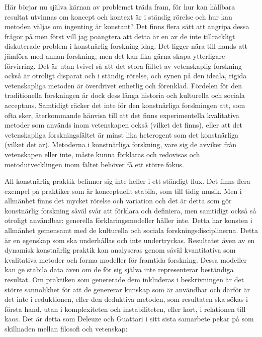 \documentclass[11pt]{article}
\begin{document}
Här börjar nu själva kärnan av problemet träda fram, för hur kan
hållbara resultat utvinnas om koncept och kontext är i ständig rörelse
och hur kan metoden väljas om ingenting är konstant? Det finns flera
sätt att angripa dessa frågor på men först vill jag poängtera att
detta är en av de inte tillräckligt diskuterade problem i konstnärlig
forskning idag. Det ligger nära till hands att jämföra med annan
forskning, men det kan lika gärna skapa ytterligare förvirring. Det är
utan tvivel så att det stora fältet av vetenskaplig forskning också är
otroligt disparat och i ständig rörelse, och synen på den ideala,
rigida vetenskapliga metoden är överdrivet enhetlig och
förenklad. Fördelen för den traditionella forskningen är dock dess
långa historia och kulturella och sociala acceptans. Samtidigt räcker
det inte för den konstnärliga forskningen att, som ofta sker,
återkommande hänvisa till att det finns experimentella kvalitativa
metoder som används inom vetenskapen också (vilket det finns), eller
att det vetenskapliga forskningsfältet är minst lika heterogent som
det konstnärliga (vilket det är). Metoderna i konstnärliga forskning,
vare sig de avviker från vetenskapen eller inte, måste kunna förklaras
och redovisas och metodutvecklingen inom fältet behöver få ett större
fokus.

All konstnärlig praktik befinner sig inte heller i ett ständigt
flux. Det finns flera exempel på praktiker som är konceptuellt
stabila, som till tidig musik. Men i allmänhet finns det mycket
rörelse och variation och det är detta som gör konstnärlig forskning
såväl svår att förklara och definiera, men samtidigt också så otroligt
användbar: generella förklaringsmodeller håller inte. Detta har
konsten i allmänhet gemensamt med de kulturella och sociala
forskningsdisciplinerna. Detta är en egenskap som ska underhållas och
inte undertryckas. Resultatet även av en dynamisk konstnärlig praktik
kan analyseras genom såväl kvantitativa som kvalitativa metoder och
forma modeller för framtida forskning. Dessa modeller kan ge stabila
data även om de för sig själva inte representerar
beständiga resultat. Om praktiken som genererade dem inkluderas i
beskrivningen är det större sannolikhet för att de genererar kunskap
som är användbar och därför är det inte i
reduktionen, eller den deduktiva metoden, som resultaten ska sökas i
första hand, utan i komplexiteten och instabiliteten, eller kort, i
relationen till kaos. Det är detta som Deleuze och Guattari i sitt
sista samarbete  pekar på
som skillnaden mellan filosofi och vetenskap:
\end{document}
